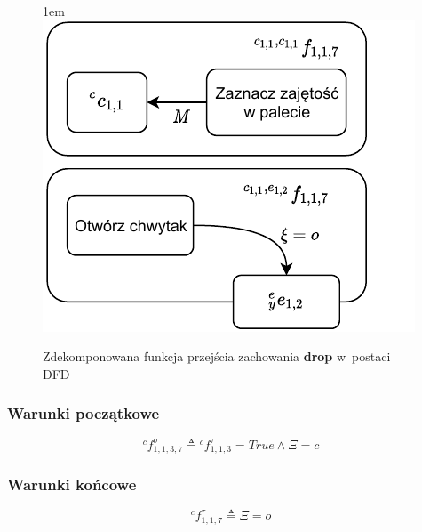 \begin{figure}[ht]
    \leftskip1em
    \includegraphics[width=\columnwidth]{figures/ISR-cs-fp-drop.pdf}
    \caption{Zdekomponowana funkcja przejścia zachowania \textbf{drop} w~postaci DFD}
    \label{fig:cs-fp-drop}
\end{figure}

\subsubsection{Warunki początkowe}
\begin{equation}
    {}^{c}f^{\sigma}_{1,1,3,7} \triangleq {}^{c}f^{\tau}_{1,1,3} = True \land \Xi = c
\end{equation}

\subsubsection{Warunki końcowe}
\begin{equation}
    {}^{c}f^{\tau}_{1,1,7} \triangleq \Xi = o
\end{equation}
